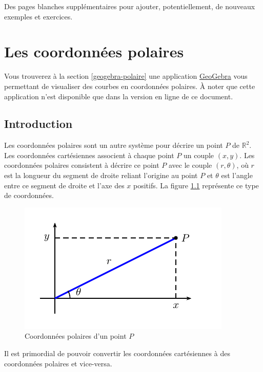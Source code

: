 \documentclass[]{book}
\theoremstyle{definition}
\theoremstyle{definition}
\theoremstyle{definition}
\theoremstyle{remark}
\begin{document}
Des pages blanches supplémentaires pour ajouter, potentiellement, de
nouveaux exemples et exercices.


\hypertarget{coordpolaires}{%
\chapter{Les coordonnées polaires}\label{coordpolaires}}

Vous trouverez à la section \ref{geogebra-polaire} une application
\href{https://www.geogebra.org/?lang=fr}{GeoGebra} vous permettant de
visualiser des courbes en coordonnées polaires. À noter que cette
application n'est disponible que dans la version en ligne de ce
document.

\hypertarget{introduction-2}{%
\section{Introduction}\label{introduction-2}}

Les coordonnées polaires sont un autre système pour décrire un point
\(P\) de \(\mathbb{R}^2\). Les coordonnées cartésiennes associent à
chaque point \(P\) un couple \((x,y)\). Les coordonnées polaires
consistent à décrire ce point \(P\) avec le couple \((r,\theta)\), où
\(r\) est la longueur du segment de droite reliant l'origine au point
\(P\) et \(\theta\) est l'angle entre ce segment de droite et l'axe des
\(x\) positifs. La figure \ref{fig:coordpolaires} représente ce type de
coordonnées.

\begin{figure}

{\centering \includegraphics[width=0.5\linewidth]{resources/images/latex/coordpolaires} 

}

\caption{Coordonnées polaires d'un point $P$}\label{fig:coordpolaires}
\end{figure}

Il est primordial de pouvoir convertir les coordonnées cartésiennes à
des coordonnées polaires et vice-versa.
\end{document}
